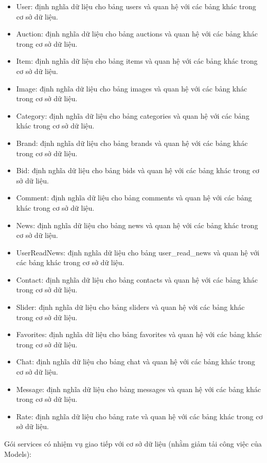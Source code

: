 \documentclass[../DoAn.tex]{subfiles}
\begin{document}
\begin{itemize}
    \item User: định nghĩa dữ liệu cho bảng users và quan hệ với các bảng khác trong cơ sở dữ liệu.
    \item Auction: định nghĩa dữ liệu cho bảng auctions và quan hệ với các bảng khác trong cơ sở dữ liệu.
    \item Item: định nghĩa dữ liệu cho bảng items và quan hệ với các bảng khác trong cơ sở dữ liệu.
    \item Image: định nghĩa dữ liệu cho bảng images và quan hệ với các bảng khác trong cơ sở dữ liệu.
    \item Category: định nghĩa dữ liệu cho bảng categories và quan hệ với các bảng khác trong cơ sở dữ liệu.
    \item Brand: định nghĩa dữ liệu cho bảng brands và quan hệ với các bảng khác trong cơ sở dữ liệu.
    \item Bid: định nghĩa dữ liệu cho bảng bids và quan hệ với các bảng khác trong cơ sở dữ liệu.
    \item Comment: định nghĩa dữ liệu cho bảng comments và quan hệ với các bảng khác trong cơ sở dữ liệu.
    \item News: định nghĩa dữ liệu cho bảng news và quan hệ với các bảng khác trong cơ sở dữ liệu.
    \item UserReadNews: định nghĩa dữ liệu cho bảng user\_read\_news và quan hệ với các bảng khác trong cơ sở dữ liệu.
    \item Contact: định nghĩa dữ liệu cho bảng contacts và quan hệ với các bảng khác trong cơ sở dữ liệu.
    \item Slider: định nghĩa dữ liệu cho bảng sliders và quan hệ với các bảng khác trong cơ sở dữ liệu.
    \item Favorites: định nghĩa dữ liệu cho bảng favorites và quan hệ với các bảng khác trong cơ sở dữ liệu.
    \item Chat: định nghĩa dữ liệu cho bảng chat và quan hệ với các bảng khác trong cơ sở dữ liệu.
    \item Message: định nghĩa dữ liệu cho bảng messages và quan hệ với các bảng khác trong cơ sở dữ liệu.
    \item Rate: định nghĩa dữ liệu cho bảng rate và quan hệ với các bảng khác trong cơ sở dữ liệu.
\end{itemize}
Gói services có nhiệm vụ giao tiếp với cơ sở dữ liệu (nhằm giảm tải công việc của Models):
\end{document}
